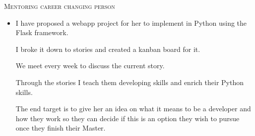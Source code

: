 %
%
%

	\begin{scholarship}
    {
        \textsc{Mentoring career changing person}
        \begin{itemize}
          \item I have proposed a webapp project for her to implement in Python using the Flask framework.

          I broke it down to stories and created a kanban board for it.

          We meet every week to discuss the current story.

          Through the stories I teach them developing skills and enrich their Python skills.

          The end target is to give her an idea on what it means to be a developer and how they work so they
          can decide if this is an option they wish to pursue once they finish their Master.
				\end{itemize}
			}
	\end{scholarship}